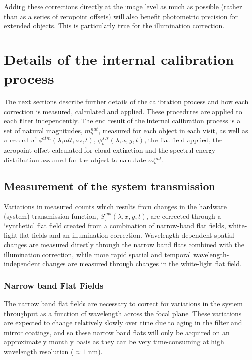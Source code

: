 \documentclass[12pt,preprint]{aastex}
\begin{document}
Adding these corrections directly at the image level as much as
possible (rather than as a series of zeropoint offsets) will also
benefit photometric precision for extended objects. This is
particularly true for the illumination correction.

\section{Details of the internal calibration process}

The next sections describe further details of the calibration process
and how each correction is measured, calculated and applied. These
procedures are applied to each filter independently. The end
result of the internal calibration process is a set of natural
magnitudes, $m_b^{nat}$, measured for each object in each visit, as
well as a record of $\phi^{atm}(\lambda,alt,az,t)$,
$\phi_b^{sys}(\lambda,x,y,t)$, the flat field applied, the
zeropoint offset calculated for cloud extinction and the spectral
energy distribution assumed for the object to calculate $m_b^{nat}$.

\subsection{Measurement of the system transmission}

Variations in measured counts which results from changes in the hardware
(system) transmission function, $S_b^{sys}(\lambda,x,y,t)$, are corrected
through a `synthetic' flat field created from a combination of
narrow-band flat fields, white-light flat fields and an illumination correction.
Wavelength-dependent spatial changes are measured directly through the
narrow band flats combined with the illumination correction, while
more rapid spatial and temporal wavelength-independent changes are
measured through changes in the white-light flat field.

\subsubsection{Narrow band Flat Fields}
\label{sec:narrowband}

The narrow band flat fields are necessary to correct for variations in
the system throughput as a function of wavelength across the focal
plane. These variations are expected to change relatively slowly over
time due to aging in the filter and mirror coatings, and so these
narrow band flats will only be acquired on an approximately monthly
basis as they can be very time-consuming at high wavelength resolution
($\approx1$ nm).
\end{document}
